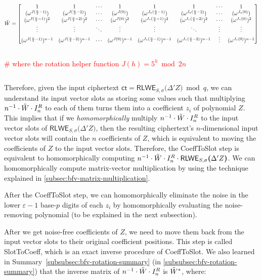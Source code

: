 $\tilde{W} = \begin{bmatrix}
1 & 1 & \cdots & 1 & 1 & 1 & \cdots & 1\\
(\omega^{J(\frac{n}{2} - 1)}) & (\omega^{J(\frac{n}{2} - 2)}) & \cdots & (\omega^{J(0)}) & (\omega^{J_*(\frac{n}{2} - 1)}) & (\omega^{J_*(\frac{n}{2} - 2)}) & \cdots & (\omega^{J_*(0)})\\
(\omega^{J(\frac{n}{2} - 1)})^2 & (\omega^{J(\frac{n}{2} - 2)})^2 & \cdots & (\omega^{J(0)})^2 & (\omega^{J_*(\frac{n}{2} - 1)})^2 & (\omega^{J_*(\frac{n}{2} - 2)})^2 & \cdots & (\omega^{J_*(0)})^2 \\
\vdots & \vdots & \ddots & \vdots & \vdots & \ddots & \vdots & \vdots \\
(\omega^{J(\frac{n}{2} - 1)})^{n-1} & (\omega^{J(\frac{n}{2} - 2)})^{n-1} & \cdots & (\omega^{J(0)})^{n-1} & (\omega^{J_*(\frac{n}{2} - 1)})^{n-1} & (\omega^{J_*(\frac{n}{2} - 2)})^{n-1} & \vdots  & (\omega^{J_*(0)})^{n-1}
\end{bmatrix}$

$ $

\textcolor{red}{ \# where the rotation helper function $J(h) = 5^h \bmod 2n$}

$ $

Therefore, given the input ciphertext $\textsf{ct} = \textsf{RLWE}_{S, \sigma}\bm(\Delta' Z\bm) \bmod q$, we can understand its input vector slots as storing some values such that multiplying $n^{-1}\cdot\tilde{W} \cdot I_n^R$ to each of them turns them into a coefficient $z_i$ of polynomial $Z$. This implies that if we \textit{homomorphically} multiply $n^{-1}\cdot\tilde{W} \cdot I_n^R$ to the input vector slots of $\textsf{RLWE}_{S, \sigma}\bm(\Delta' Z\bm)$, then the resulting ciphertext's $n$-dimensional input vector slots will contain the $n$ coefficients of $Z$, which is equivalent to moving the coefficients of $Z$ to the input vector slots. Therefore, the \textsf{CoeffToSlot} step is equivalent to homomorphically computing $n^{-1}\cdot\tilde{W} \cdot I_n^R \cdot \textsf{RLWE}_{S, \sigma}\bm(\Delta' Z\bm)$. We can homomorphically compute matrix-vector multiplication by using the technique explained in \autoref{subsec:bfv-matrix-multiplication}.

After the \textsf{CoeffToSlot} step, we can homomorphically eliminate the noise in the lower $\varepsilon-1$ base-$p$ digits of each $z_i$ by homomorphically evaluating the noise-removing polynomial (to be explained in the next subsection).  

After we get noise-free coefficients of $Z$, we need to move them back from the input vector slots to their original coefficient positions. This step is called \textsf{SlotToCoeff}, which is an exact inverse procedure of \textsf{CoeffToSlot}. We also learned in Summary~\ref*{subsubsec:bfv-rotation-summary} (in \autoref{subsubsec:bfv-rotation-summary}) that the inverse matrix of $n^{-1}\cdot\tilde{W} \cdot I_n^R$ is $\tilde{W}^*$, where: 

